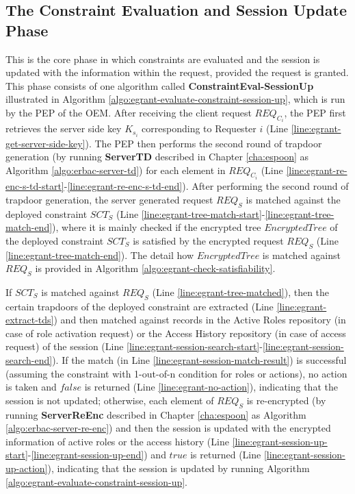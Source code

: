 \documentclass[epsfig,a4paper,11pt,titlepage]{book}
\numberwithin{algorithm}{chapter}
\begin{document}
\subsection{The Constraint Evaluation and Session Update Phase}
This is the core phase in which constraints are evaluated and the session is updated with the information within the request, provided the request is granted. This phase consists of one algorithm called \textbf{ConstraintEval-SessionUp} illustrated in Algorithm \ref{algo:egrant-evaluate-constraint-session-up}, which is run by the \gls{PEP} of the \gls{OEM}. After receiving the client request ${\mathit{REQ}}_{C_i}$, the \gls{PEP} first retrieves the server side key $K_{s_i}$ corresponding to Requester $i$ (Line \ref{line:egrant-get-server-side-key}). The \gls{PEP} then performs the second round of trapdoor generation (by running \textbf{ServerTD} described in Chapter \ref{cha:espoon} as Algorithm \ref{algo:erbac-server-td}) for each element in ${\mathit{REQ}}_{C_i}$ (Line \ref{line:egrant-re-enc-s-td-start}-\ref{line:egrant-re-enc-s-td-end}). After performing the second round of trapdoor generation, the server generated request ${\mathit{REQ}}_S$ is matched against the deployed constraint $SCT_S$ (Line \ref{line:egrant-tree-match-start}-\ref{line:egrant-tree-match-end}), where it is mainly checked if the encrypted tree $\mathit{EncryptedTree}$ of the deployed constraint $SCT_S$ is satisfied by the encrypted request ${\mathit{REQ}}_S$ (Line \ref{line:egrant-tree-match-end}). The detail how $\mathit{EncryptedTree}$ is matched against ${\mathit{REQ}}_S$ is provided in Algorithm \ref{algo:egrant-check-satisfiability}.

If $SCT_S$ is matched against ${\mathit{REQ}}_S$ (Line \ref{line:egrant-tree-matched}), then the certain trapdoors of the deployed constraint are extracted (Line \ref{line:egrant-extract-tds}) and then matched against records in the Active Roles repository (in case of role activation request) or the Access History repository (in case of access request) of the session (Line \ref{line:egrant-session-search-start}-\ref{line:egrant-session-search-end}). If the match (in Line \ref{line:egrant-session-match-result}) is successful (assuming the constraint with 1-out-of-n condition for roles or actions), no action is taken and $\mathit{false}$ is returned (Line \ref{line:egrant-no-action}), indicating that the session is not updated; otherwise, each element of ${\mathit{REQ}}_S$ is re-encrypted (by running \textbf{ServerReEnc} described in Chapter \ref{cha:espoon} as Algorithm \ref{algo:erbac-server-re-enc}) and then the session is updated with the encrypted information of active roles or the access history (Line \ref{line:egrant-session-up-start}-\ref{line:egrant-session-up-end}) and $\mathit{true}$ is returned (Line \ref{line:egrant-session-up-action}), indicating that the session is updated by running Algorithm \ref{algo:egrant-evaluate-constraint-session-up}.
\end{document}
